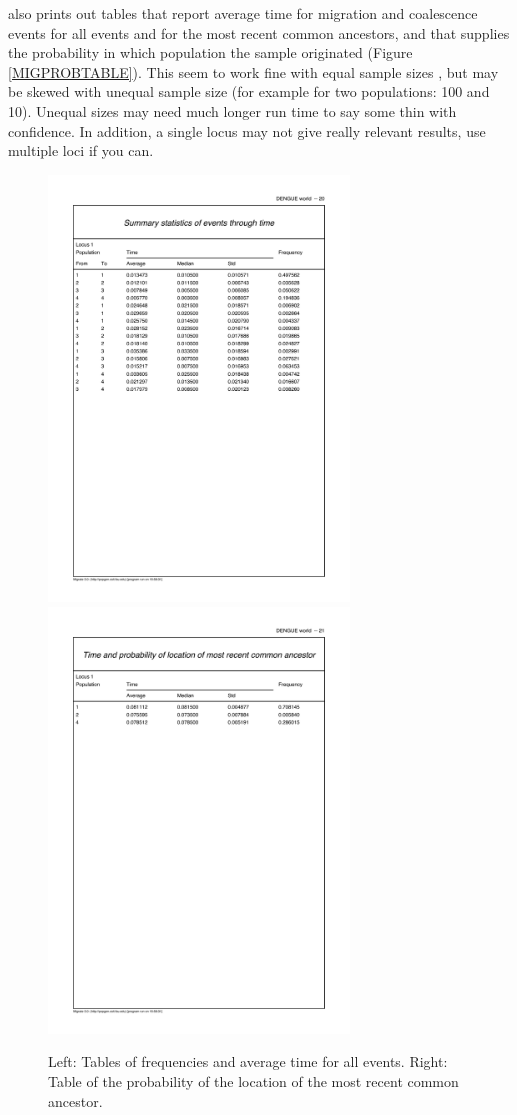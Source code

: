 \migrate also prints out tables that report average time for migration and coalescence events for all events and for the most recent common ancestors, and that supplies the probability in which population the sample originated (Figure \ref{MIGPROBTABLE}). This seem to work fine with equal sample sizes , but may be skewed with unequal sample size (for example for two populations: 100 and 10). Unequal sizes may need much longer run time to say some thin with confidence. In addition, a single locus may not give really relevant results, use multiple loci if you can.
\begin{figure}[htb]
\begin{center}
\includegraphics[width=8cm]{mim/sumfreq}
\includegraphics[width=8cm]{mim/timeMRCA}
\end{center}
\caption{Left: Tables of frequencies and average time for all events. Right: Table of the probability of the location of the most recent common ancestor. \label{MIGPROB}}
\end{figure}

